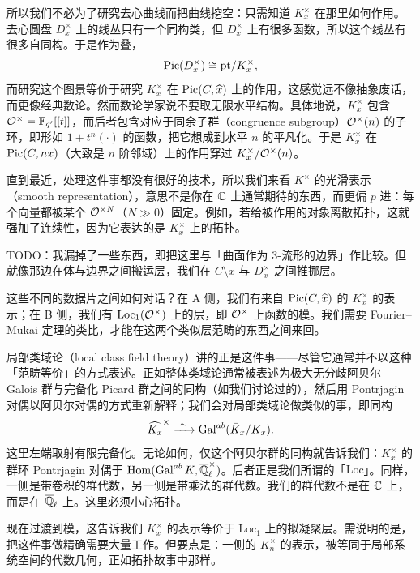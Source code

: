 所以我们不必为了研究去心曲线而把曲线挖空：只需知道 $K_x^\times$ 在那里如何作用。去心圆盘 $D_x^\times$ 上的线丛只有一个同构类，但 $D_x^\times$ 上有很多函数，所以这个线丛有很多自同构。于是作为叠，
\[
  \operatorname{Pic}(D_x^\times) \cong \mathrm{pt}/K_x^\times,
\]
而研究这个图景等价于研究 $K_x^\times$ 在 $\operatorname{Pic}(C,\widehat{x})$ 上的作用，这感觉远不像抽象废话，而更像经典数论。然而数论学家说不要取无限水平结构。具体地说，$K_x^\times$ 包含 $\mathcal{O}^\times=\mathbb{F}_{q'}[[t]]$，而后者包含对应于同余子群（congruence subgroup）$\mathcal{O}^\times(n)$ 的子环，即形如 $1+t^n(\cdot)$ 的函数，把它想成到水平 $n$ 的平凡化。于是 $K_x^\times$ 在 $\operatorname{Pic}(C,nx)$（大致是 $n$ 阶邻域）上的作用穿过 $K_x^\times/\mathcal{O}^\times(n)$。

直到最近，处理这件事都没有很好的技术，所以我们来看 $K^\times$ 的光滑表示（smooth representation），意思不是你在 $\mathbb{C}$ 上通常期待的东西，而更偏 $p$ 进：每个向量都被某个 $\mathcal{O}^{\times N}$（$N\gg 0$）固定。例如，若给被作用的对象离散拓扑，这就强加了连续性，因为它表达的是 $K_x^\times$ 上的拓扑。

TODO：我漏掉了一些东西，即把这里与「曲面作为 3-流形的边界」作比较。但就像那边在体与边界之间搬运层，我们在 $C\setminus x$ 与 $D_x^\times$ 之间推挪层。

这些不同的数据片之间如何对话？在 A 侧，我们有来自 $\operatorname{Pic}(C,\widehat{x})$ 的 $K_x^\times$ 的表示；在 B 侧，我们有 $\mathrm{Loc}_1(\mathcal{O}^\times)$ 上的层，即 $\mathcal{O}^\times$ 上函数的模。我们需要 Fourier–Mukai 定理的类比，才能在这两个类似层范畴的东西之间来回。


局部类域论（local class field theory）讲的正是这件事——尽管它通常并不以这种「范畴等价」的方式表述。正如整体类域论通常被表述为极大无分歧阿贝尔 Galois 群与完备化 Picard 群之间的同构（如我们讨论过的），然后用 Pontrjagin 对偶以阿贝尔对偶的方式重新解释；我们会对局部类域论做类似的事，即同构
\[
  \widehat{K_x}^\times \xrightarrow{\ \sim\ } \operatorname{Gal}^{ab}(\bar{K}_x/K_x).
\]
这里左端取射有限完备化。无论如何，仅这个阿贝尔群的同构就告诉我们：$K_x^\times$ 的群环 Pontrjagin 对偶于 $\operatorname{Hom}(\operatorname{Gal}^{ab}K,\overline{\mathbb{Q}}_\ell^\times)$。后者正是我们所谓的「$\mathrm{Loc}$」。同样，一侧是带卷积的群代数，另一侧是带乘法的群代数。我们的群代数不是在 $\mathbb{C}$ 上，而是在 $\overline{\mathbb{Q}}_\ell$ 上。这里必须小心拓扑。

现在过渡到模，这告诉我们 $K_x^\times$ 的表示等价于 $\mathrm{Loc}_1$ 上的拟凝聚层。需说明的是，把这件事做精确需要大量工作。但要点是：一侧的 $K_n^\times$ 的表示，被等同于局部系统空间的代数几何，正如拓扑故事中那样。

